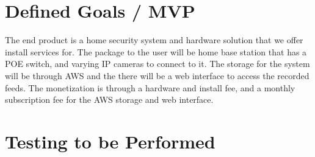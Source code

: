 \documentclass{report}
\begin{document}
\chapter{Defined Goals / MVP}
The end product is a home security system and hardware solution that we offer install services for. 
The package to the user will be home base station that has a POE switch, and varying IP cameras to connect to it. 
The storage for the system will be through AWS and the there will be a web interface to access the recorded feeds. 
The monetization is through a hardware and install fee, and a monthly subscription fee for the AWS storage and web interface. 

\chapter{Testing to be Performed}
\end{document}
